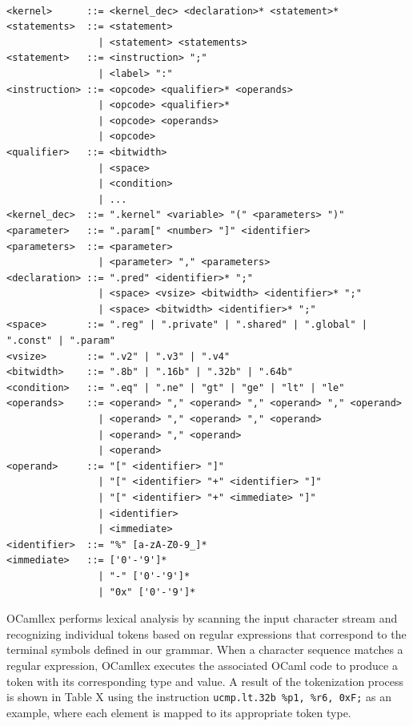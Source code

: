 \begin{center}
\begin{lstlisting}[numbers=none]

<kernel>      ::= <kernel_dec> <declaration>* <statement>*
<statements>  ::= <statement>
                | <statement> <statements>
<statement>   ::= <instruction> ";"
                | <label> ":"
<instruction> ::= <opcode> <qualifier>* <operands>
                | <opcode> <qualifier>*
                | <opcode> <operands>
                | <opcode>
<qualifier>   ::= <bitwidth>
                | <space>
                | <condition>
                | ...
<kernel_dec>  ::= ".kernel" <variable> "(" <parameters> ")"
<parameter>   ::= ".param[" <number> "]" <identifier>
<parameters>  ::= <parameter>
                | <parameter> "," <parameters>
<declaration> ::= ".pred" <identifier>* ";"
                | <space> <vsize> <bitwidth> <identifier>* ";"
                | <space> <bitwidth> <identifier>* ";"
<space>       ::= ".reg" | ".private" | ".shared" | ".global" | ".const" | ".param" 
<vsize>       ::= ".v2" | ".v3" | ".v4"
<bitwidth>    ::= ".8b" | ".16b" | ".32b" | ".64b"
<condition>   ::= ".eq" | ".ne" | "gt" | "ge" | "lt" | "le"
<operands>    ::= <operand> "," <operand> "," <operand> "," <operand>
                | <operand> "," <operand> "," <operand> 
                | <operand> "," <operand>
                | <operand>
<operand>     ::= "[" <identifier> "]"
                | "[" <identifier> "+" <identifier> "]"
                | "[" <identifier> "+" <immediate> "]"
                | <identifier>
                | <immediate>
<identifier>  ::= "%" [a-zA-Z0-9_]*
<immediate>   ::= ['0'-'9']*
                | "-" ['0'-'9']*
                | "0x" ['0'-'9']*

\end{lstlisting}
\end{center}

OCamllex performs lexical analysis by scanning the input character stream and
recognizing individual tokens based on regular expressions that correspond to
the terminal symbols defined in our grammar. When a character sequence matches
a regular expression, OCamllex executes the associated OCaml code to produce a
token with its corresponding type and value. A result of the tokenization
process is shown in Table X using the instruction
\lstinline{ucmp.lt.32b %p1, %r6, 0xF;} as an example, where each element is
mapped to its appropriate token type.

